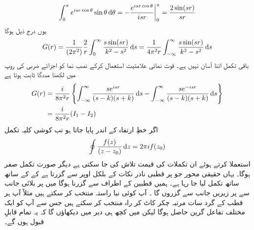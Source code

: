 \begin{align}
	\int_{0}^{\pi}e^{isr\cos\theta}\sin\theta\dif\theta = -\frac{e^{isr\cos\theta}}{isr}\bigg|^\pi_{0} = \frac{2\sin(sr)}{sr}
\end{align}
یوں درج ذیل ہوگا
\begin{align}
	G(r) = \frac{1}{(2\pi^2)}\frac{2}{r}\int_{0}^{\infty}\frac{s \sin(sr)}{k^2-s^2}\dif s = \frac{1}{4\pi^2r}\int_{-\infty}^{\infty}\frac{s \sin(sr)}{k^2-s^2}\dif s
\end{align}
باقی تکمل اتنا آسان نہیں ہے۔ قوت نمائی علامتیت استعمال کرکے نصب نما کو اجزائے ضربی کی روپ میں لکھنا مددگا ثابت ہوتا ہے
\begin{align}
	G(r) &= \frac{i}{8\pi^2r}\left\{\int_{-\infty}^{\infty}\frac{se^{isr}}{(s-k)(s+k)}\dif s-\int_{-\infty}^{\infty}\frac{se^{-isr}}{(s-k)(s+k)}\dif s\right\}\nonumber \\
	&= \frac{i}{8\pi^2r}(I_1-I_2)
\end{align}
اگر  خطِ ارتفاہ کے اندر پایا جاتا ہو تب کوشی کلیہ تکمل 
\begin{align}
	\oint\frac{f(z)}{(z-z_0)}\dif z = 2\pi if(z_0)
\end{align}
استعملا کرتے ہوئے ان تکملات کی قیمت تلاش کی جا سکتی ہے دیگر صورت تکمل صفر ہوگا۔ یہاں حقیقی محور جو  پر قطبی نادر نکات کے بلکل اوپر سے گزرتا ہے کے کے ساتھ ساتھ تکمل لیا جا رہا ہے۔ ہمیں قطبین کے اطراف سے گزرنا ہوگا میں  پر بلائی جانب سے  پر زیریں جانب سے گزروں گا ۔ آپ کوئی نیا راستہ منتخب کر سکتے ہیں مثلاً آپ ہر قطب کے گرد سات مرتبہ چکر کاٹ کر راہ منتخب کر سکتے ہیں جس سے آپ کو ایک مختلف تفاعل گرین حاصل ہوگا لیکن میں کچھ ہی دیر میں دیکھاؤں گا کہ یہ تمام قابلِ قبول ہوں گے۔

